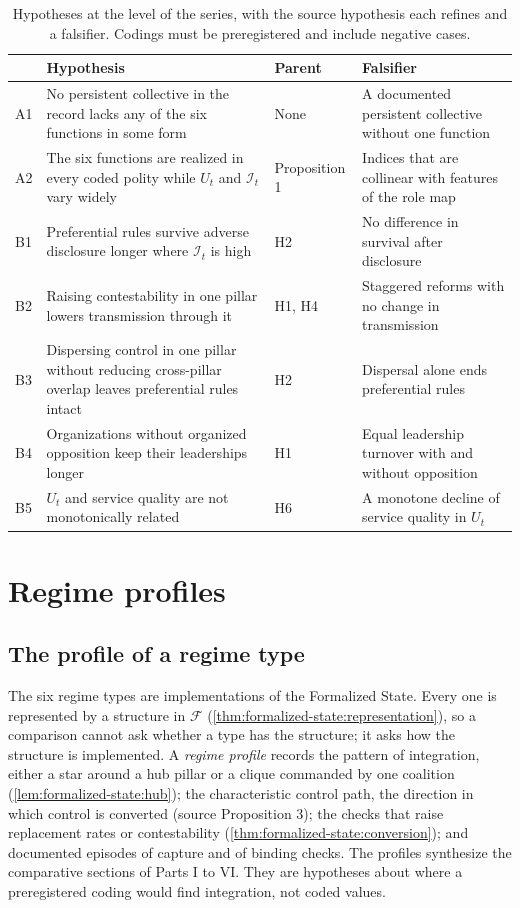 \documentclass[11pt,letterpaper]{article}
\theoremstyle{definition}
\theoremstyle{remark}
\newcommand{\Integ}{\mathcal{I}}
\begin{document}
\begin{table}[!htbp]
\centering
\small
\caption{Hypotheses at the level of the series, with the source hypothesis each refines and a falsifier. Codings must be preregistered and include negative cases.}
\label{tab:hypotheses}
\begin{tabularx}{\textwidth}{@{}L{0.6cm}YL{1.9cm}Y@{}}
\toprule
 & Hypothesis & Parent & Falsifier \\
\midrule
A1 & No persistent collective in the record lacks any of the six functions in some form & None & A documented persistent collective without one function \\
A2 & The six functions are realized in every coded polity while $U_t$ and $\Integ_t$ vary widely & Proposition 1 & Indices that are collinear with features of the role map \\
B1 & Preferential rules survive adverse disclosure longer where $\Integ_t$ is high & H2 & No difference in survival after disclosure \\
B2 & Raising contestability in one pillar lowers transmission through it & H1, H4 & Staggered reforms with no change in transmission \\
B3 & Dispersing control in one pillar without reducing cross-pillar overlap leaves preferential rules intact & H2 & Dispersal alone ends preferential rules \\
B4 & Organizations without organized opposition keep their leaderships longer & H1 & Equal leadership turnover with and without opposition \\
B5 & $U_t$ and service quality are not monotonically related & H6 & A monotone decline of service quality in $U_t$ \\
\bottomrule
\end{tabularx}
\end{table}

\section{Regime profiles}
\label{sec:regimes}

\subsection{The profile of a regime type}

The six regime types are implementations of the Formalized State. Every one is represented by a structure in $\mathcal{F}$ (\cref{thm:formalized-state:representation}), so a comparison cannot ask whether a type has the structure; it asks how the structure is implemented. A \emph{regime profile} records the pattern of integration, either a star around a hub pillar or a clique commanded by one coalition (\cref{lem:formalized-state:hub}); the characteristic control path, the direction in which control is converted (source Proposition 3); the checks that raise replacement rates or contestability (\cref{thm:formalized-state:conversion}); and documented episodes of capture and of binding checks. The profiles synthesize the comparative sections of Parts I to VI. They are hypotheses about where a preregistered coding would find integration, not coded values.
\end{document}
